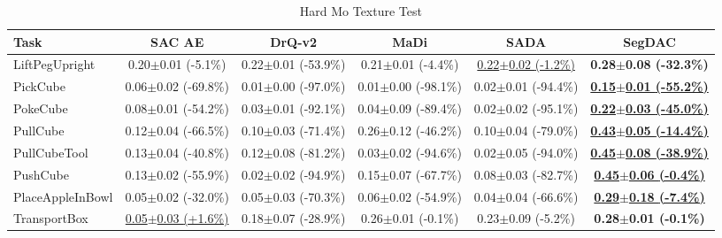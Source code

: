 \begin{table}[htbp]
\centering
\scriptsize
\caption{Hard Mo Texture Test}
\label{tab:appendix_motexturetest_hard}
\begin{adjustbox}{max width=\textwidth}
\begin{tabular}{l*{5}{c}}
\toprule
\textbf{Task} & \textbf{SAC AE} & \textbf{DrQ-v2} & \textbf{MaDi} & \textbf{SADA} & \textbf{SegDAC} \\
\midrule
LiftPegUpright & 0.20$\pm$0.01 \scriptsize{(-5.1\%)} & 0.22$\pm$0.01 \scriptsize{(-53.9\%)} & 0.21$\pm$0.01 \scriptsize{(-4.4\%)} & \underline{0.22$\pm$0.02 \scriptsize{(-1.2\%)}} & \textbf{0.28$\pm$0.08 \scriptsize{(-32.3\%)}} \\
PickCube & 0.06$\pm$0.02 \scriptsize{(-69.8\%)} & 0.01$\pm$0.00 \scriptsize{(-97.0\%)} & 0.01$\pm$0.00 \scriptsize{(-98.1\%)} & 0.02$\pm$0.01 \scriptsize{(-94.4\%)} & \textbf{\underline{0.15$\pm$0.01 \scriptsize{(-55.2\%)}}} \\
PokeCube & 0.08$\pm$0.01 \scriptsize{(-54.2\%)} & 0.03$\pm$0.01 \scriptsize{(-92.1\%)} & 0.04$\pm$0.09 \scriptsize{(-89.4\%)} & 0.02$\pm$0.02 \scriptsize{(-95.1\%)} & \textbf{\underline{0.22$\pm$0.03 \scriptsize{(-45.0\%)}}} \\
PullCube & 0.12$\pm$0.04 \scriptsize{(-66.5\%)} & 0.10$\pm$0.03 \scriptsize{(-71.4\%)} & 0.26$\pm$0.12 \scriptsize{(-46.2\%)} & 0.10$\pm$0.04 \scriptsize{(-79.0\%)} & \textbf{\underline{0.43$\pm$0.05 \scriptsize{(-14.4\%)}}} \\
PullCubeTool & 0.13$\pm$0.04 \scriptsize{(-40.8\%)} & 0.12$\pm$0.08 \scriptsize{(-81.2\%)} & 0.03$\pm$0.02 \scriptsize{(-94.6\%)} & 0.02$\pm$0.05 \scriptsize{(-94.0\%)} & \textbf{\underline{0.45$\pm$0.08 \scriptsize{(-38.9\%)}}} \\
PushCube & 0.13$\pm$0.02 \scriptsize{(-55.9\%)} & 0.02$\pm$0.02 \scriptsize{(-94.9\%)} & 0.15$\pm$0.07 \scriptsize{(-67.7\%)} & 0.08$\pm$0.03 \scriptsize{(-82.7\%)} & \textbf{\underline{0.45$\pm$0.06 \scriptsize{(-0.4\%)}}} \\
PlaceAppleInBowl & 0.05$\pm$0.02 \scriptsize{(-32.0\%)} & 0.05$\pm$0.03 \scriptsize{(-70.3\%)} & 0.06$\pm$0.02 \scriptsize{(-54.9\%)} & 0.04$\pm$0.04 \scriptsize{(-66.6\%)} & \textbf{\underline{0.29$\pm$0.18 \scriptsize{(-7.4\%)}}} \\
TransportBox & \underline{0.05$\pm$0.03 \scriptsize{(+1.6\%)}} & 0.18$\pm$0.07 \scriptsize{(-28.9\%)} & 0.26$\pm$0.01 \scriptsize{(-0.1\%)} & 0.23$\pm$0.09 \scriptsize{(-5.2\%)} & \textbf{0.28$\pm$0.01 \scriptsize{(-0.1\%)}} \\
\bottomrule
\end{tabular}
\end{adjustbox}
\end{table}

